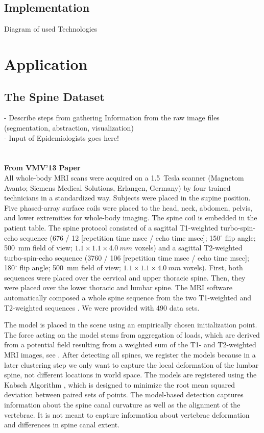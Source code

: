\documentclass[journal]{style/vgtc}           %
\begin{document}
\subsection{Implementation}
Diagram of used Technologies

\section{Application}

\subsection{The Spine Dataset}
- Describe steps from gathering Information from the raw image files (segmentation, abstraction, visualization)\\
- Input of Epidemiologists goes here!\\
\\\\
\textbf{From VMV'13 Paper}\\

All whole-body MRI scans were acquired on a 1.5~Tesla scanner (Magnetom Avanto; Siemens Medical Solutions, Erlangen, Germany) by four trained technicians in a standardized way. Subjects were placed in the supine position. Five phased-array surface coils were placed to the head, neck, abdomen, pelvis, and lower extremities for whole-body imaging. The spine coil is embedded in the patient table. The spine protocol consisted of a sagittal T1-weighted turbo-spin-echo sequence (676 / 12 [repetition time msec / echo time msec]; 150$^\circ$ flip angle; 500~mm field of view; $1.1\times1.1\times4.0~mm$ voxels) and a sagittal T2-weighted turbo-spin-echo sequence (3760 / 106 [repetition time msec / echo time msec]; 180$^\circ$ flip angle; 500~mm field of view; $1.1\times1.1\times4.0~mm$ voxels). First, both sequences were placed over the cervical and upper thoracic spine. Then, they were placed over the lower thoracic and lumbar spine. The MRI software automatically composed a whole spine sequence from the two T1-weighted and T2-weighted sequences \cite{Hegenscheid2013}. We were provided with 490 data sets.

The model is placed in the scene using an empirically chosen initialization point. The force acting on the model stems from aggregation of loads, which are derived from a potential field resulting from a weighted sum of the T1- and T2-weighted MRI images, see \cite{FEM2013}. After detecting all spines, we register the models because in a later clustering step we only want to capture the local deformation of the lumbar spine, not different locations in world space. The models are registered using the Kabsch Algorithm \cite{Kabsch1976}, which is designed to minimize the root mean squared deviation between paired sets of points.
The model-based detection captures information about the spine canal curvature as well as the alignment of the vertebrae. It is not meant to capture information about vertebrae deformation and differences in spine canal extent.
\end{document}
